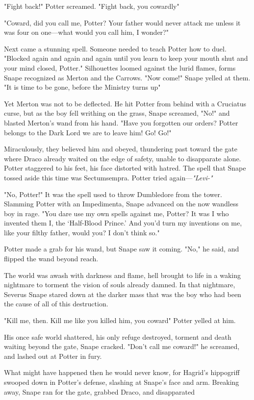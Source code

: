 "Fight back!" Potter screamed. "Fight back, you cowardly{\el}"

"Coward, did you call me, Potter? Your father would never attack me unless it was four on one—what would you call him, I wonder?"

Next came a stunning spell. Someone needed to teach Potter how to duel. "Blocked again and again and again until you learn to keep your mouth shut and your mind closed, Potter." Silhouettes loomed against the lurid flames, forms Snape recognized as Merton and the Carrows. "Now come!" Snape yelled at them. "It is time to be gone, before the Ministry turns up{\el}"

Yet Merton was not to be deflected. He hit Potter from behind with a Cruciatus curse, but as the boy fell writhing on the grass, Snape screamed, "No!" and blasted Merton's wand from his hand. "Have you forgotten our orders? Potter belongs to the Dark Lord{\el} we are to leave him! Go! Go!"

Miraculously, they believed him and obeyed, thundering past toward the gate where Draco already waited on the edge of safety, unable to disapparate alone. Potter staggered to his feet, his face distorted with hatred. The spell that Snape tossed aside this time was Sectumsempra. Potter tried again—\emph{"Levi-"}

"No, Potter!" It was the spell used to throw Dumbledore from the tower. Slamming Potter with an Impedimenta, Snape advanced on the now wandless boy in rage. "You dare use my own spells against me, Potter? It was I who invented them{\el} I, the `Half-Blood Prince.' And you'd turn my inventions on me, like your filthy father, would you? I don't think so."

Potter made a grab for his wand, but Snape saw it coming. "No," he said, and flipped the wand beyond reach.

The world was awash with darkness and flame, hell brought to life in a waking nightmare to torment the vision of souls already damned. In that nightmare, Severus Snape stared down at the darker mass that was the boy who had been the cause of all of this destruction.

"Kill me, then. Kill me like you killed him, you coward{\el}" Potter yelled at him.

His once safe world shattered, his only refuge destroyed, torment and death waiting beyond the gate, Snape cracked. "Don't call me coward!" he screamed, and lashed out at Potter in fury.

What might have happened then he would never know, for Hagrid's hippogriff swooped down in Potter's defense, slashing at Snape's face and arm. Breaking away, Snape ran for the gate, grabbed Draco, and disapparated{\el}


